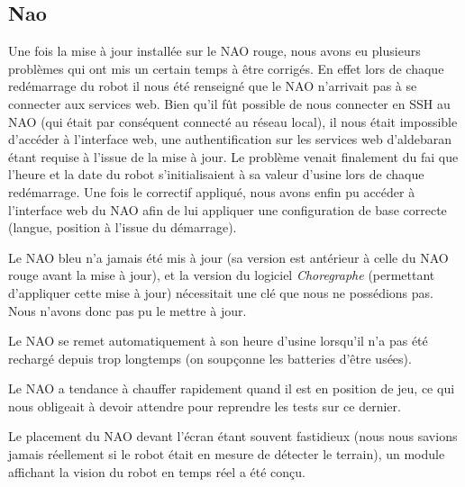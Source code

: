 \subsection{Nao}
\par Une fois la mise à jour installée sur le NAO rouge, nous avons eu plusieurs problèmes qui ont mis un certain temps à être corrigés.
      En effet lors de chaque redémarrage du robot il nous été renseigné que le NAO n’arrivait pas à se connecter aux services web.
      Bien qu’il fût possible de nous connecter en SSH au NAO (qui était par conséquent connecté au réseau local),
      il nous était impossible d’accéder à l’interface web, une authentification sur les services web d’aldebaran étant requise à l’issue de la mise à jour.
      Le problème venait finalement du fai que l’heure et la date du robot s’initialisaient à sa valeur d’usine lors de chaque redémarrage.
      Une fois le correctif appliqué, nous avons enfin pu accéder à l'interface web du NAO afin de lui appliquer une configuration de base correcte (langue, position à l'issue du démarrage).
\par Le NAO bleu n’a jamais été mis à jour (sa version est antérieur à celle du NAO rouge avant la mise à jour),
      et la version du logiciel \textit{Choregraphe} (permettant d’appliquer cette mise à jour) nécessitait une clé que nous ne possédions pas. Nous n'avons donc pas pu le mettre à jour.
\par Le NAO se remet automatiquement à son heure d’usine lorsqu’il n’a pas été rechargé depuis trop longtemps (on soupçonne les batteries d’être usées).
\par Le NAO a tendance à chauffer rapidement quand il est en position de jeu, ce qui nous obligeait à devoir attendre pour reprendre les tests sur ce dernier.
\par Le placement du NAO devant l’écran étant souvent fastidieux (nous nous savions jamais réellement si le robot était en mesure de détecter le terrain), un module affichant la vision du robot en temps réel a été conçu.

